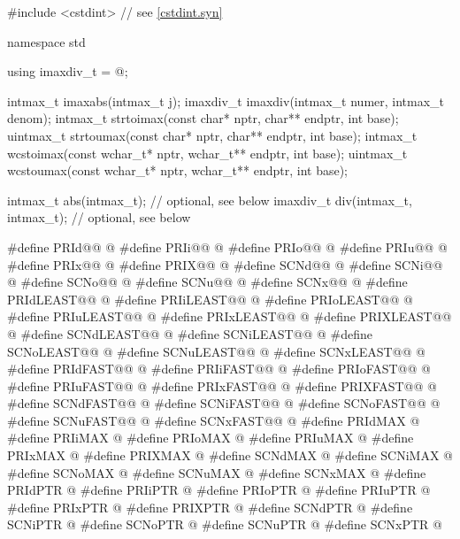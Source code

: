 \begin{codeblock}
#include <cstdint>  // see \ref{cstdint.syn}

namespace std {
  using imaxdiv_t = @\seebelow@;

  intmax_t imaxabs(intmax_t j);
  imaxdiv_t imaxdiv(intmax_t numer, intmax_t denom);
  intmax_t strtoimax(const char* nptr, char** endptr, int base);
  uintmax_t strtoumax(const char* nptr, char** endptr, int base);
  intmax_t wcstoimax(const wchar_t* nptr, wchar_t** endptr, int base);
  uintmax_t wcstoumax(const wchar_t* nptr, wchar_t** endptr, int base);

  intmax_t abs(intmax_t);               // optional, see below
  imaxdiv_t div(intmax_t, intmax_t);    // optional, see below
}

#define PRId@@ @\seebelow@
#define PRIi@@ @\seebelow@
#define PRIo@@ @\seebelow@
#define PRIu@@ @\seebelow@
#define PRIx@@ @\seebelow@
#define PRIX@@ @\seebelow@
#define SCNd@@ @\seebelow@
#define SCNi@@ @\seebelow@
#define SCNo@@ @\seebelow@
#define SCNu@@ @\seebelow@
#define SCNx@@ @\seebelow@
#define PRIdLEAST@@ @\seebelow@
#define PRIiLEAST@@ @\seebelow@
#define PRIoLEAST@@ @\seebelow@
#define PRIuLEAST@@ @\seebelow@
#define PRIxLEAST@@ @\seebelow@
#define PRIXLEAST@@ @\seebelow@
#define SCNdLEAST@@ @\seebelow@
#define SCNiLEAST@@ @\seebelow@
#define SCNoLEAST@@ @\seebelow@
#define SCNuLEAST@@ @\seebelow@
#define SCNxLEAST@@ @\seebelow@
#define PRIdFAST@@ @\seebelow@
#define PRIiFAST@@ @\seebelow@
#define PRIoFAST@@ @\seebelow@
#define PRIuFAST@@ @\seebelow@
#define PRIxFAST@@ @\seebelow@
#define PRIXFAST@@ @\seebelow@
#define SCNdFAST@@ @\seebelow@
#define SCNiFAST@@ @\seebelow@
#define SCNoFAST@@ @\seebelow@
#define SCNuFAST@@ @\seebelow@
#define SCNxFAST@@ @\seebelow@
#define PRIdMAX @\seebelow@
#define PRIiMAX @\seebelow@
#define PRIoMAX @\seebelow@
#define PRIuMAX @\seebelow@
#define PRIxMAX @\seebelow@
#define PRIXMAX @\seebelow@
#define SCNdMAX @\seebelow@
#define SCNiMAX @\seebelow@
#define SCNoMAX @\seebelow@
#define SCNuMAX @\seebelow@
#define SCNxMAX @\seebelow@
#define PRIdPTR @\seebelow@
#define PRIiPTR @\seebelow@
#define PRIoPTR @\seebelow@
#define PRIuPTR @\seebelow@
#define PRIxPTR @\seebelow@
#define PRIXPTR @\seebelow@
#define SCNdPTR @\seebelow@
#define SCNiPTR @\seebelow@
#define SCNoPTR @\seebelow@
#define SCNuPTR @\seebelow@
#define SCNxPTR @\seebelow@
\end{codeblock}

